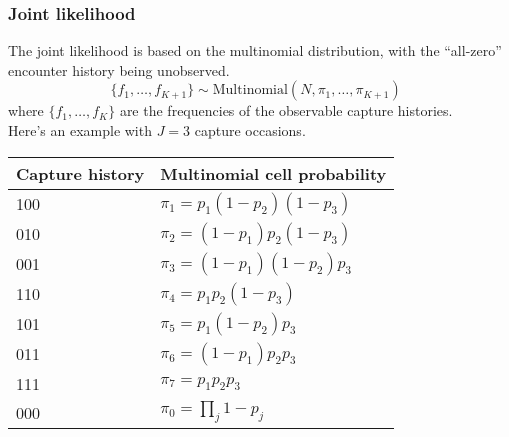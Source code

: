 \documentclass[color=usenames,dvipsnames]{beamer}\usepackage[]{graphicx}\usepackage[]{xcolor}
\begin{document}
\begin{frame}
  \frametitle{Joint likelihood}
  \small
  The joint likelihood is based on the multinomial distribution, with
  the ``all-zero'' encounter history being unobserved. \\  
  \begin{equation*}
    \{f_1, \dots, f_{K+1}\} \sim \mathrm{Multinomial}(N, \pi_1, \dots, \pi_{K+1}) \;\;
  \end{equation*}
  where $\{f_1, \dots, f_K\}$ are the frequencies of the observable capture
  histories. \\
  \vfill
  Here's an example with $J=3$ capture occasions.  \\
  \vfill
  \centering
    \begin{tabular}{ll}
      \hline
      Capture history       & Multinomial cell probability \\
      \hline
      100                   & $\pi_1=p_1(1-p_2)(1-p_3)$    \\
      010                   & $\pi_2=(1-p_1)p_2(1-p_3)$    \\
      001                   & $\pi_3=(1-p_1)(1-p_2)p_3$    \\
      110                   & $\pi_4=p_1p_2(1-p_3)$        \\
      101                   & $\pi_5=p_1(1-p_2)p_3$        \\
      011                   & $\pi_6=(1-p_1)p_2p_3$        \\
      111                   & $\pi_7 = p_1p_2p_3$          \\
      000                   & $\pi_0 = \prod_j 1-p_j$      \\
      \hline
    \end{tabular}
\end{frame}
\end{document}
